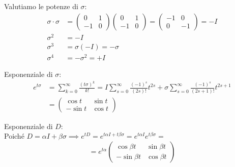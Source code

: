 \documentclass[openany]{book}
\theoremstyle{definition}
\theoremstyle{remark}
\begin{document}
Valutiamo le potenze di $\sigma$:
\begin{align*}
    \sigma \cdot \sigma &= \begin{pmatrix} 0 & 1 \\ -1 & 0 \end{pmatrix} \begin{pmatrix} 0 & 1 \\ -1 & 0 \end{pmatrix} = \begin{pmatrix} -1 & 0 \\ 0 & -1 \end{pmatrix} = -I \\
    \sigma^2 &= -I \\
    \sigma^3 &= \sigma(-I) = -\sigma \\
    \sigma^4 &= -\sigma^2 = +I
\end{align*}

Esponenziale di $\sigma$:
\begin{align*}
    e^{t\sigma} &= \sum_{k=0}^{\infty} \frac{(t\sigma)^k}{k!} = I \sum_{s=0}^{\infty} \frac{(-1)^s}{(2s)!} t^{2s} + \sigma \sum_{s=0}^{\infty} \frac{(-1)^s}{(2s+1)!} t^{2s+1} \\
    &= \begin{pmatrix} \cos t & \sin t \\ -\sin t & \cos t \end{pmatrix}
\end{align*}


Esponenziale di $D$: \\
Poiché $D = \alpha I + \beta \sigma \implies e^{tD} = e^{t\alpha I + t\beta \sigma} = e^{t\alpha I} e^{t\beta \sigma} = $
\begin{equation*}
    = e^{t\alpha} \begin{pmatrix} \cos \beta t & \sin \beta t \\ -\sin \beta t & \cos \beta t \end{pmatrix}
\end{equation*}
\end{document}

